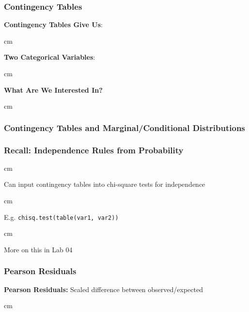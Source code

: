 \documentclass{beamer} %
\begin{document}
\begin{frame}\frametitle{Contingency Tables}
	\small
	
	\textbf{Contingency Tables Give Us}:  %
	
	 cm
	
	\textbf{Two Categorical Variables}:  %
	
	 cm
	
	\textbf{What Are We Interested In?}  %
	
	
	
	
	
	 cm
	
\end{frame}


\begin{frame}\frametitle{Contingency Tables and Marginal/Conditional Distributions}
	\small
	
	
	
\end{frame}



\begin{frame}\frametitle{Recall:  Independence Rules from Probability}
	\small
	
	 cm
	
	Can input contingency tables into chi-square tests for independence
	
	 cm
	
	E.g. \texttt{chisq.test(table(var1, var2))}
	
	 cm
	
	More on this in Lab 04
	
\end{frame}


\begin{frame}\frametitle{Pearson Residuals}
	\small
	
	\textbf{Pearson Residuals:}  Scaled difference between observed/expected%
	
	
	 cm
	
\end{frame}
\end{document}
